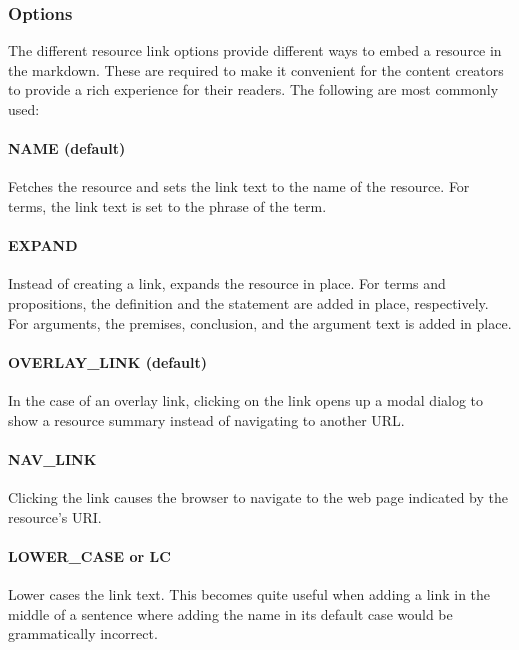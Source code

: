 \documentclass[a4paper]{article}
\begin{document}
\subsubsection{Options}

The different resource link options provide different ways to embed a resource in the markdown. These are required to make it convenient for the content creators to provide a rich experience for their readers. The following are most commonly used:


\paragraph{NAME (default)}

Fetches the resource and sets the link text to the name of the resource. For terms, the link text is set to the phrase of the term.


\paragraph{EXPAND}

Instead of creating a link, expands the resource in place. For terms and propositions, the definition and the statement are added in place, respectively. For arguments, the premises, conclusion, and the argument text is added in place.


\paragraph{OVERLAY\_LINK (default)}

In the case of an overlay link, clicking on the link opens up a modal dialog to show a resource summary instead of navigating to another URL.


\paragraph{NAV\_LINK}

Clicking the link causes the browser to navigate to the web page indicated by the resource's URI.


\paragraph{LOWER\_CASE or LC}

Lower cases the link text. This becomes quite useful when adding a link in the middle of a sentence where adding the name in its default case would be grammatically incorrect.
\end{document}
